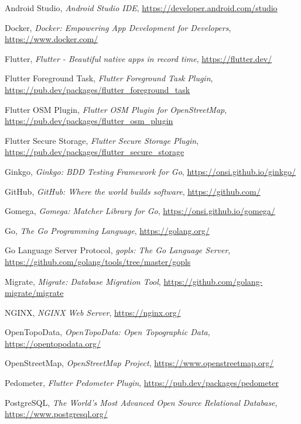 \documentclass[11pt,a4paper]{article}
\begin{document}
\begin{thebibliography}{9}
Android Studio, \emph{Android Studio IDE}, \url{https://developer.android.com/studio}

Docker, \emph{Docker: Empowering App Development for Developers}, \url{https://www.docker.com/}

Flutter, \emph{Flutter - Beautiful native apps in record time}, \url{https://flutter.dev/}

Flutter Foreground Task, \emph{Flutter Foreground Task Plugin}, \url{https://pub.dev/packages/flutter_foreground_task}

Flutter OSM Plugin, \emph{Flutter OSM Plugin for OpenStreetMap}, \url{https://pub.dev/packages/flutter_osm_plugin}

Flutter Secure Storage, \emph{Flutter Secure Storage Plugin}, \url{https://pub.dev/packages/flutter_secure_storage}

Ginkgo, \emph{Ginkgo: BDD Testing Framework for Go}, \url{https://onsi.github.io/ginkgo/}

GitHub, \emph{GitHub: Where the world builds software}, \url{https://github.com/}

Gomega, \emph{Gomega: Matcher Library for Go}, \url{https://onsi.github.io/gomega/}

Go, \emph{The Go Programming Language}, \url{https://golang.org/}

Go Language Server Protocol, \emph{gopls: The Go Language Server}, \url{https://github.com/golang/tools/tree/master/gopls}

Migrate, \emph{Migrate: Database Migration Tool}, \url{https://github.com/golang-migrate/migrate}

NGINX, \emph{NGINX Web Server}, \url{https://nginx.org/}

OpenTopoData, \emph{OpenTopoData: Open Topographic Data}, \url{https://opentopodata.org/}

OpenStreetMap, \emph{OpenStreetMap Project}, \url{https://www.openstreetmap.org/}

Pedometer, \emph{Flutter Pedometer Plugin}, \url{https://pub.dev/packages/pedometer}

PostgreSQL, \emph{The World's Most Advanced Open Source Relational Database}, \url{https://www.postgresql.org/}


\end{thebibliography}
\end{document}
